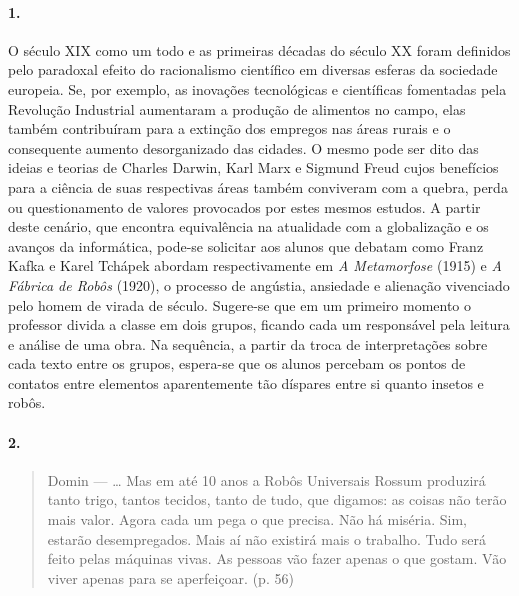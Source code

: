 \documentclass[11pt]{hedrabook}
\begin{document}
\paragraph{1.} 

O século XIX como um todo e as primeiras décadas do século XX foram definidos
pelo paradoxal efeito do racionalismo científico em diversas esferas da
sociedade europeia. Se, por exemplo, as inovações tecnológicas e científicas
fomentadas pela Revolução Industrial aumentaram a produção de alimentos no
campo, elas também contribuíram para a extinção dos empregos nas áreas rurais e
o consequente aumento desorganizado das cidades. O mesmo pode ser dito das
ideias e teorias de Charles Darwin, Karl Marx e Sigmund Freud cujos benefícios
para a ciência de suas respectivas áreas também conviveram com a quebra, perda
ou questionamento de valores provocados por estes mesmos estudos. A partir
deste cenário, que encontra equivalência na atualidade com a globalização e os
avanços da informática, pode-se solicitar aos alunos que debatam como Franz
Kafka e Karel Tchápek abordam respectivamente em \textit{A Metamorfose} (1915)
e \textit{A Fábrica de Robôs} (1920), o processo de angústia, ansiedade e
alienação vivenciado pelo homem de virada de século. Sugere-se que em um
primeiro momento o professor divida a classe em dois grupos, ficando cada um
responsável pela leitura e análise de uma obra. Na sequência, a partir da troca
de interpretações sobre cada texto entre os grupos, espera-se que os alunos
percebam os pontos de contatos entre elementos aparentemente tão díspares entre
si quanto insetos e robôs.


\paragraph{2.}

\begin{quote}
  Domin  ---  \ldots{} Mas em até 10 anos a Robôs Universais Rossum produzirá
  tanto trigo, tantos tecidos, tanto de tudo, que digamos: as coisas não terão
  mais valor. Agora cada um pega o que precisa. Não há miséria. Sim, estarão
  desempregados. Mais aí não existirá mais o trabalho. Tudo será feito pelas
  máquinas vivas. As pessoas vão fazer apenas o que gostam. Vão viver apenas para
  se aperfeiçoar. (p. 56)
\end{quote}
\end{document}
